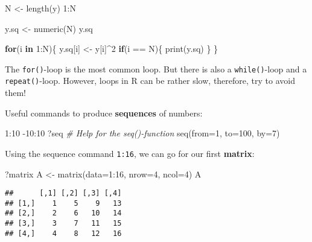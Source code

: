 \documentclass[
]{book}
\newenvironment{Shaded}{\begin{snugshade}}{\end{snugshade}}
\newcommand{\AttributeTok}[1]{\textcolor[rgb]{0.77,0.63,0.00}{#1}}
\newcommand{\CommentTok}[1]{\textcolor[rgb]{0.56,0.35,0.01}{\textit{#1}}}
\newcommand{\ControlFlowTok}[1]{\textcolor[rgb]{0.13,0.29,0.53}{\textbf{#1}}}
\newcommand{\DecValTok}[1]{\textcolor[rgb]{0.00,0.00,0.81}{#1}}
\newcommand{\FunctionTok}[1]{\textcolor[rgb]{0.00,0.00,0.00}{#1}}
\newcommand{\NormalTok}[1]{#1}
\newcommand{\OtherTok}[1]{\textcolor[rgb]{0.56,0.35,0.01}{#1}}
\newcommand{\SpecialCharTok}[1]{\textcolor[rgb]{0.00,0.00,0.00}{#1}}
\begin{document}
\begin{Shaded}
\begin{Highlighting}[]
\NormalTok{N }\OtherTok{\textless{}{-}} \FunctionTok{length}\NormalTok{(y)}
\DecValTok{1}\SpecialCharTok{:}\NormalTok{N}

\NormalTok{y.sq }\OtherTok{\textless{}{-}} \FunctionTok{numeric}\NormalTok{(N)}
\NormalTok{y.sq}

\ControlFlowTok{for}\NormalTok{(i }\ControlFlowTok{in} \DecValTok{1}\SpecialCharTok{:}\NormalTok{N)\{}
\NormalTok{  y.sq[i] }\OtherTok{\textless{}{-}}\NormalTok{ y[i]}\SpecialCharTok{\^{}}\DecValTok{2}
  \ControlFlowTok{if}\NormalTok{(i }\SpecialCharTok{==}\NormalTok{ N)\{}
    \FunctionTok{print}\NormalTok{(y.sq)}
\NormalTok{  \}}
\NormalTok{\}}
\end{Highlighting}
\end{Shaded}

The \texttt{for()}-loop is the most common loop. But there is also a \texttt{while()}-loop and a \texttt{repeat()}-loop. However, loops in R can be rather slow, therefore, try to avoid them!

Useful commands to produce \textbf{sequences} of numbers:

\begin{Shaded}
\begin{Highlighting}[]
\DecValTok{1}\SpecialCharTok{:}\DecValTok{10}
\SpecialCharTok{{-}}\DecValTok{10}\SpecialCharTok{:}\DecValTok{10}
\NormalTok{?seq }\CommentTok{\# Help for the seq(){-}function}
\FunctionTok{seq}\NormalTok{(}\AttributeTok{from=}\DecValTok{1}\NormalTok{, }\AttributeTok{to=}\DecValTok{100}\NormalTok{, }\AttributeTok{by=}\DecValTok{7}\NormalTok{)}
\end{Highlighting}
\end{Shaded}

Using the sequence command \texttt{1:16}, we can go for our first \textbf{matrix}:

\begin{Shaded}
\begin{Highlighting}[]
\NormalTok{?matrix}
\NormalTok{A }\OtherTok{\textless{}{-}} \FunctionTok{matrix}\NormalTok{(}\AttributeTok{data=}\DecValTok{1}\SpecialCharTok{:}\DecValTok{16}\NormalTok{, }\AttributeTok{nrow=}\DecValTok{4}\NormalTok{, }\AttributeTok{ncol=}\DecValTok{4}\NormalTok{)}
\NormalTok{A}
\end{Highlighting}
\end{Shaded}

\begin{verbatim}
##      [,1] [,2] [,3] [,4]
## [1,]    1    5    9   13
## [2,]    2    6   10   14
## [3,]    3    7   11   15
## [4,]    4    8   12   16
\end{verbatim}
\end{document}
